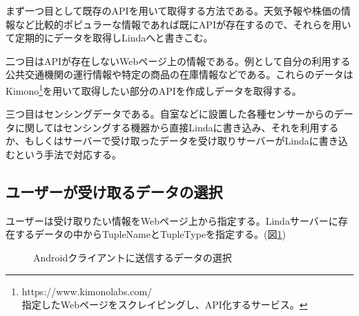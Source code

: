 まず一つ目として既存のAPIを用いて取得する方法である。天気予報や株価の情報など比較的ポピュラーな情報であれば既にAPIが存在するので、それらを用いて定期的にデータを取得しLindaへと書きこむ。

二つ目はAPIが存在しないWebページ上の情報である。例として自分の利用する公共交通機関の運行情報や特定の商品の在庫情報などである。これらのデータはKimono\footnote{https://www.kimonolabs.com/\\指定したWebページをスクレイピングし、API化するサービス。}を用いて取得したい部分のAPIを作成しデータを取得する。

三つ目はセンシングデータである。自室などに設置した各種センサーからのデータに関してはセンシングする機器から直接Lindaに書き込み、それを利用するか、もしくはサーバーで受け取ったデータを受け取りサーバーがLindaに書き込むという手法で対応する。

\subsection{ユーザーが受け取るデータの選択}

ユーザーは受け取りたい情報をWebページ上から指定する。Lindaサーバーに存在するデータの中からTupleNameとTupleTypeを指定する。(図\ref{fig:select})

\begin{figure}[htbp]
  \begin{minipage}{\hsize}
    \begin{center}
    \end{center}
    \caption{Androidクライアントに送信するデータの選択}
    \label{fig:select}
  \end{minipage}
\end{figure}

